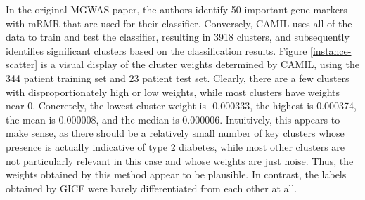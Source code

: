 In the original MGWAS paper, the authors identify 50 important gene markers with mRMR that are used for their classifier. Conversely, CAMIL uses all of the data to train and test the classifier, resulting in 3918 clusters, and subsequently identifies significant clusters based on the classification results. Figure \ref{instance-scatter} is a visual display of the cluster weights determined by CAMIL, using the 344 patient training set and 23 patient test set. Clearly, there are a few clusters with disproportionately high or low weights, while most clusters have weights near 0. Concretely, the lowest cluster weight is -0.000333, the highest is 0.000374, the mean is 0.000008, and the median is 0.000006. Intuitively, this appears to make sense, as there should be a relatively small number of key clusters whose presence is actually indicative of type 2 diabetes, while most other clusters are not particularly relevant in this case and whose weights are just noise. Thus, the weights obtained by this method appear to be plausible. In contrast, the labels obtained by GICF were barely differentiated from each other at all.